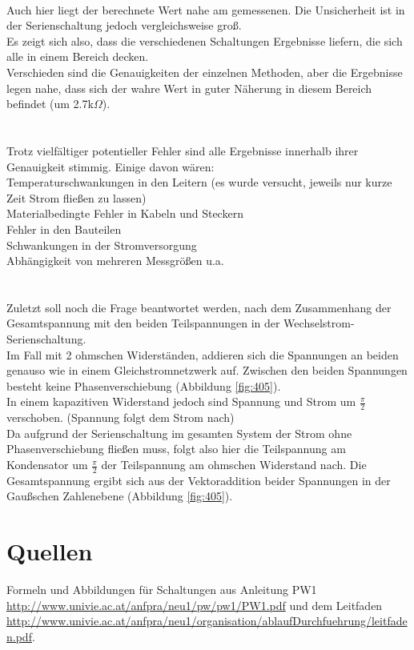 \documentclass[12pt,a4paper]{article}
\begin{document}
\begin{multicols}{2}
\\
Auch hier liegt der berechnete Wert nahe am gemessenen. Die Unsicherheit ist in der Serienschaltung jedoch vergleichsweise groß.\\
Es zeigt sich also, dass die verschiedenen Schaltungen Ergebnisse liefern, die sich alle in einem Bereich decken.\\
Verschieden sind die Genauigkeiten der einzelnen Methoden, aber die Ergebnisse legen nahe, dass sich der wahre Wert in guter Näherung in diesem Bereich befindet (um 2.7k$\Omega$).\\
\\
\\
Trotz vielfältiger potentieller Fehler sind alle Ergebnisse innerhalb ihrer Genauigkeit stimmig. Einige davon wären:\\
Temperaturschwankungen in den Leitern (es wurde versucht, jeweils nur kurze Zeit Strom fließen zu lassen)\\
Materialbedingte Fehler in Kabeln und Steckern\\
Fehler in den Bauteilen\\
Schwankungen in der Stromversorgung\\
Abhängigkeit von mehreren Messgrößen u.a.\\
\\
\\
Zuletzt soll noch die Frage beantwortet werden, nach dem Zusammenhang der Gesamtspannung mit den beiden Teilspannungen in der Wechselstrom-Serienschaltung.\\
Im Fall mit 2 ohmschen Widerständen, addieren sich die Spannungen an beiden genauso wie in einem Gleichstromnetzwerk auf. Zwischen den beiden Spannungen besteht keine Phasenverschiebung (Abbildung \ref{fig:405}).\\
In einem kapazitiven Widerstand jedoch sind Spannung und Strom um $\frac{\pi}{2}$ verschoben. (Spannung folgt dem Strom nach)\\
Da aufgrund der Serienschaltung im gesamten System der Strom ohne Phasenverschiebung fließen muss, folgt also hier die Teilspannung am Kondensator um $\frac{\pi}{2}$ der Teilspannung am ohmschen Widerstand nach. Die Gesamtspannung ergibt sich aus der Vektoraddition beider Spannungen in der Gaußschen Zahlenebene (Abbildung \ref{fig:405}).



\end{multicols}
\section{Quellen}
Formeln und Abbildungen für Schaltungen aus Anleitung PW1 \url{http://www.univie.ac.at/anfpra/neu1/pw/pw1/PW1.pdf} und dem Leitfaden \url{http://www.univie.ac.at/anfpra/neu1/organisation/ablaufDurchfuehrung/leitfaden.pdf}.
\end{document}
